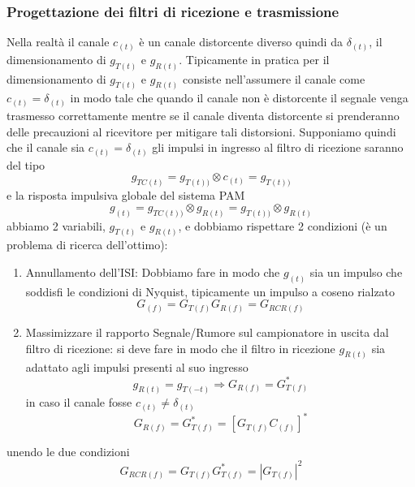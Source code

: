         \subsubsection{Progettazione dei filtri di ricezione e trasmissione}
            Nella realtà il canale $c_{(t)}$ è un canale distorcente diverso quindi da $\delta_{(t)}$, il dimensionamento di $g_{T(t)}$
            e $g_{R(t)}$. Tipicamente in pratica per il dimensionamento di $g_{T(t)}$ e $g_{R(t)}$ consiste nell'assumere il canale 
            come $c_{(t)} = \delta_{(t)}$ in modo tale che quando il canale non è distorcente il segnale venga trasmesso correttamente
            mentre se il canale diventa distorcente si prenderanno delle precauzioni al ricevitore per mitigare tali distorsioni.
            Supponiamo quindi che il canale sia $c_{(t)} = \delta_{(t)}$ gli impulsi in ingresso al filtro di ricezione saranno del tipo
            \[
                g_{TC(t)} = g_{T(t))} \otimes c_{(t)} =  g_{T(t))} 
            \]
            e la risposta impulsiva globale del sistema PAM
            \[
                g_{(t)} = g_{TC(t))} \otimes g_{R(t)} =  g_{T(t))} \otimes g_{R(t)}
            \]
            abbiamo 2 variabili, $g_{T(t)}$ e $g_{R(t)}$, e dobbiamo rispettare 2 condizioni (è un problema di ricerca dell'ottimo):
            \begin{enumerate}
                \item {
                    Annullamento dell'ISI: Dobbiamo fare in modo che $g_{(t)}$ sia un impulso che soddisfi le condizioni di Nyquist,
                    tipicamente un impulso a coseno rialzato
                    \[
                        G_{(f)} = G_{T(f)} G_{R(f)} = G_{RCR(f)} 
                    \]
                }
                \item {
                    Massimizzare il rapporto Segnale/Rumore sul campionatore in uscita dal filtro di ricezione:
                    si deve fare in modo che il filtro in ricezione $g_{R(t)}$ sia adattato agli impulsi presenti al suo ingresso
                    \[
                        g_{R(t)} = g_{T(-t)} \Rightarrow G_{R(f)} = G_{T(f)}^\ast
                    \]
                    in caso il canale fosse $c_{(t)} \neq \delta_{(t)}$ 
                    \[
                        G_{R(f)} = G_{T(f)}^\ast = \left[G_{T(f)} C_{(f)}\right]^\ast  
                    \]                
                }
            \end{enumerate}
            unendo le due condizioni 
            \[
                G_{RCR(f)} = G_{T(f)}G_{T(f)}^\ast = \left|G_{T(f)}\right|^2  
            \]
